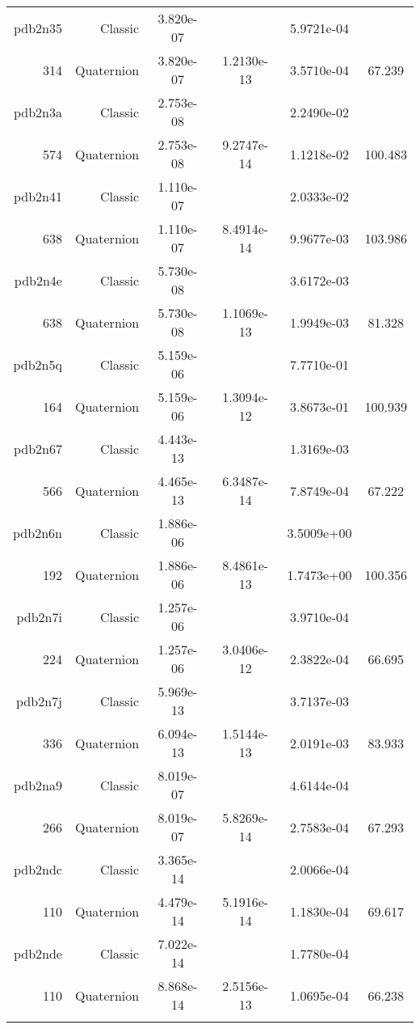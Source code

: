 \begin{xltabular}{\textwidth}{r|rS[table-format=1.3e+2]S[table-format=1.4e+2]S[table-format=1.4e+2]S[table-format=-1.3]}
pdb2n35 & Classic & 3.820e-07 &  & 5.9721e-04 & \\
314 & Quaternion & 3.820e-07 & 1.2130e-13 & 3.5710e-04 & 67.239\\  \addlinespace
pdb2n3a & Classic & 2.753e-08 &  & 2.2490e-02 & \\
574 & Quaternion & 2.753e-08 & 9.2747e-14 & 1.1218e-02 & 100.483\\  \addlinespace
pdb2n41 & Classic & 1.110e-07 &  & 2.0333e-02 & \\
638 & Quaternion & 1.110e-07 & 8.4914e-14 & 9.9677e-03 & 103.986\\  \addlinespace
pdb2n4e & Classic & 5.730e-08 &  & 3.6172e-03 & \\
638 & Quaternion & 5.730e-08 & 1.1069e-13 & 1.9949e-03 & 81.328\\  \addlinespace
pdb2n5q & Classic & 5.159e-06 &  & 7.7710e-01 & \\
164 & Quaternion & 5.159e-06 & 1.3094e-12 & 3.8673e-01 & 100.939\\  \addlinespace
pdb2n67 & Classic & 4.443e-13 &  & 1.3169e-03 & \\
566 & Quaternion & 4.465e-13 & 6.3487e-14 & 7.8749e-04 & 67.222\\  \addlinespace
pdb2n6n & Classic & 1.886e-06 &  & 3.5009e+00 & \\
192 & Quaternion & 1.886e-06 & 8.4861e-13 & 1.7473e+00 & 100.356\\  \addlinespace
pdb2n7i & Classic & 1.257e-06 &  & 3.9710e-04 & \\
224 & Quaternion & 1.257e-06 & 3.0406e-12 & 2.3822e-04 & 66.695\\  \addlinespace
pdb2n7j & Classic & 5.969e-13 &  & 3.7137e-03 & \\
336 & Quaternion & 6.094e-13 & 1.5144e-13 & 2.0191e-03 & 83.933\\  \addlinespace
pdb2na9 & Classic & 8.019e-07 &  & 4.6144e-04 & \\
266 & Quaternion & 8.019e-07 & 5.8269e-14 & 2.7583e-04 & 67.293\\  \addlinespace
pdb2ndc & Classic & 3.365e-14 &  & 2.0066e-04 & \\
110 & Quaternion & 4.479e-14 & 5.1916e-14 & 1.1830e-04 & 69.617\\  \addlinespace
pdb2nde & Classic & 7.022e-14 &  & 1.7780e-04 & \\
110 & Quaternion & 8.868e-14 & 2.5156e-13 & 1.0695e-04 & 66.238\\  \addlinespace

\end{xltabular}
